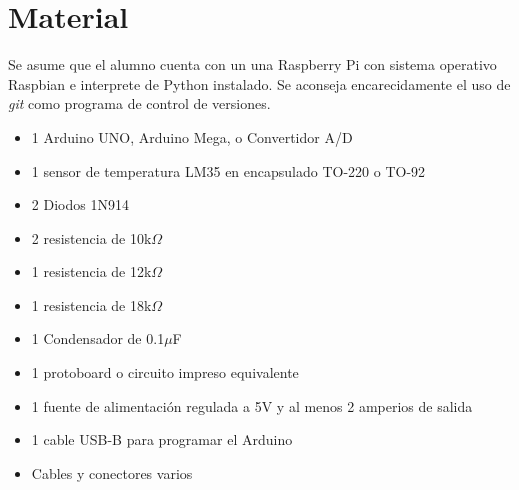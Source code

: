 %
%



\section{Material}%
\label{sec:material}
Se asume que el alumno cuenta con un una Raspberry Pi con sistema operativo Raspbian e interprete de Python instalado. Se aconseja encarecidamente el uso de \textit{git} como programa de control de versiones.

\begin{itemize}[noitemsep]
	\item 1 Arduino UNO, Arduino Mega, o Convertidor A/D \IIC{}
	\item 1 sensor de temperatura LM35 en encapsulado TO-220 o TO-92
	\item 2 Diodos 1N914
	\item 2 resistencia de 10k$\Omega$
	\item 1 resistencia de 12k$\Omega$\footnotemark
	\item 1 resistencia de 18k$\Omega$
	\item 1 Condensador de 0.1$\mu$F
	\item 1 protoboard o circuito impreso equivalente
	\item 1 fuente de alimentación regulada a 5V y al menos 2 amperios de salida
	\item 1 cable USB-B para programar el Arduino
	\item Cables y conectores varios
\end{itemize}
